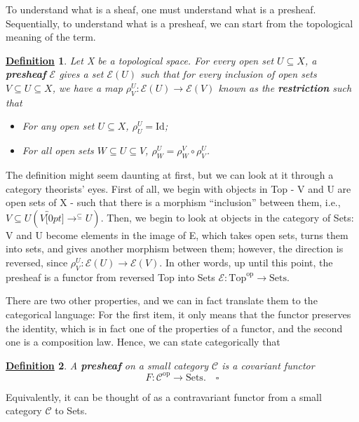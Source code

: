 \documentclass{article}
\newtheorem*{def*}{\underline{Definition}}
\begin{document}
To understand what is a sheaf, one must understand what is a presheaf. Sequentially, to understand what is a presheaf, we can start from the topological meaning of the term.
\begin{def*}
	Let X be a topological space. For every open set \(U\subseteq X\), a \textbf{presheaf} \(\mathcal{E}\) gives a set \(\mathcal{E}(U)\) such that for every inclusion of open sets \(V\subseteq U\subseteq X\), we have a map \(\rho_{V}^{U}:\mathcal{E}(U)\rightarrow \mathcal{E}(V)\) known as the \textbf{restriction} such that
	\begin{itemize}
		\item[a)] For any open set \(U\subseteq X\), \(\rho_{U}^{U}=\mathrm{Id} \);
		\item[b)] For all open sets \(W\subseteq U\subseteq V\), \(\rho_{W}^{U}=\rho_{W}^{V}\circ \rho_{V}^{U}\).
	\end{itemize}
\end{def*}
The definition might seem daunting at first, but we can look at it through a category theorists' eyes. First of all, we begin with objects in Top - V and U are open sets of X - such that there is a morphism ``inclusion'' between them, i.e., \(V\subseteq U (V\overbracket[0pt]{\rightarrow}^{\subseteq }U)\).
Then, we begin to look at objects in the category of Sets: V and U become elements in the image of E, which takes open sets, turns them into sets, and gives another morphism between them; however, the direction is reversed, since \(\rho_{V}^{U}:\mathcal{E}(U)\rightarrow \mathcal{E}(V)\). In other words, up until this point, the presheaf is a functor from reversed Top into Sets \(\mathcal{E}:\mathrm{Top}^{\mathrm{op}}\rightarrow \mathrm{Sets}\).

There are two other properties, and we can in fact translate them to the categorical language: For the first item, it only means that the functor preserves the identity, which is in fact one of the properties of a functor, and the second one is a composition law. Hence, we can state categorically that
\begin{def*}
	A \textbf{presheaf} on a small category \(\mathcal{C}\) is a covariant functor
	\[
		F:\mathcal{C}^{\mathrm{op}}\rightarrow \mathrm{Sets}.\quad \square
	\]
\end{def*}
Equivalently, it can be thought of as a contravariant functor from a small category \(\mathcal{C}\) to Sets.
\end{document}
